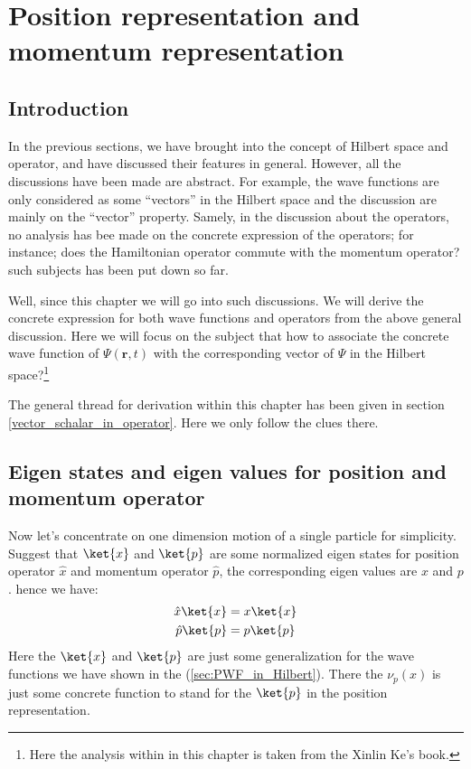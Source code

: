 %
%
%
\chapter{Position representation and momentum representation}
\label{position_momentum representation}
%
\section{Introduction}
%
%
%
In the previous sections, we have brought into the concept of
Hilbert space and operator, and have discussed their features in
general. However, all the discussions have been made are abstract.
For example, the wave functions are only considered as some
``vectors'' in the Hilbert space and the discussion are mainly on
the ``vector'' property. Samely, in the discussion about the
operators, no analysis has bee made on the concrete expression of
the operators; for instance; does the Hamiltonian operator commute
with the momentum operator? such subjects has been put down so far.

Well, since this chapter we will go into such discussions. We will
derive the concrete expression for both wave functions and operators
from the above general discussion. Here we will focus on the subject
that how to associate the concrete wave function of $\Psi(\bm{r},
t)$ with the corresponding vector of $\Psi$ in the Hilbert
space?\footnote{Here the analysis within in this chapter is taken
from the Xinlin Ke's book\cite{XingLinKe}.}

The general thread for derivation within this chapter has been given
in section \ref{vector_schalar_in_operator}. Here we only follow the
clues there.

\section{Eigen states and eigen values for position
and momentum operator}
\label{eigen_states_in_position_momentum}
%
%
%
Now let's concentrate on one dimension motion of a single particle for
simplicity. Suggest that $\ket{x}$ and $\ket{p}$ are some normalized
eigen states for position operator $\hat{x}$ and momentum operator
$\hat{p}$, the corresponding eigen values are $x$ and $p$. hence we
have:
\begin{align}
\label{PRAMReq:1}
\hat{x}\ket{x} &= x\ket{x} \nonumber \\
\hat{p}\ket{p} &= p\ket{p}
\end{align}
Here the $\ket{x}$ and $\ket{p}$ are just some generalization for
the wave functions we have shown in the (\ref{sec:PWF_in_Hilbert}).
There the $\nu_{p}(x)$ is just some concrete function to stand for
the $\ket{p}$ in the position representation.

